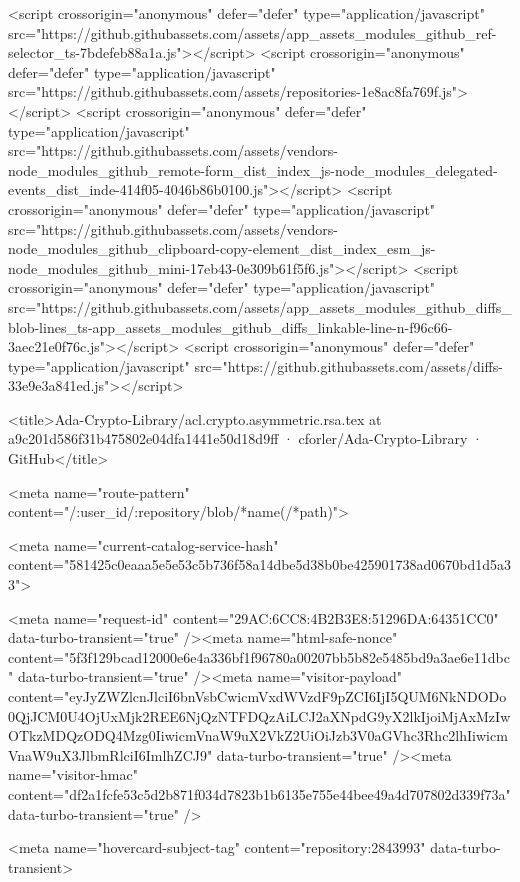<script crossorigin="anonymous" defer="defer" type="application/javascript" src="https://github.githubassets.com/assets/app_assets_modules_github_ref-selector_ts-7bdefeb88a1a.js"></script>
<script crossorigin="anonymous" defer="defer" type="application/javascript" src="https://github.githubassets.com/assets/repositories-1e8ac8fa769f.js"></script>
<script crossorigin="anonymous" defer="defer" type="application/javascript" src="https://github.githubassets.com/assets/vendors-node_modules_github_remote-form_dist_index_js-node_modules_delegated-events_dist_inde-414f05-4046b86b0100.js"></script>
<script crossorigin="anonymous" defer="defer" type="application/javascript" src="https://github.githubassets.com/assets/vendors-node_modules_github_clipboard-copy-element_dist_index_esm_js-node_modules_github_mini-17eb43-0e309b61f5f6.js"></script>
<script crossorigin="anonymous" defer="defer" type="application/javascript" src="https://github.githubassets.com/assets/app_assets_modules_github_diffs_blob-lines_ts-app_assets_modules_github_diffs_linkable-line-n-f96c66-3aec21e0f76c.js"></script>
<script crossorigin="anonymous" defer="defer" type="application/javascript" src="https://github.githubassets.com/assets/diffs-33e9e3a841ed.js"></script>
  

  <title>Ada-Crypto-Library/acl.crypto.asymmetric.rsa.tex at a9c201d586f31b475802e04dfa1441e50d18d9ff · cforler/Ada-Crypto-Library · GitHub</title>



  <meta name="route-pattern" content="/:user_id/:repository/blob/*name(/*path)">

    
  <meta name="current-catalog-service-hash" content="581425c0eaaa5e5e53c5b736f58a14dbe5d38b0be425901738ad0670bd1d5a33">


  <meta name="request-id" content="29AC:6CC8:4B2B3E8:51296DA:64351CC0" data-turbo-transient="true" /><meta name="html-safe-nonce" content="5f3f129bcad12000e6e4a336bf1f96780a00207bb5b82e5485bd9a3ae6e11dbc" data-turbo-transient="true" /><meta name="visitor-payload" content="eyJyZWZlcnJlciI6bnVsbCwicmVxdWVzdF9pZCI6IjI5QUM6NkNDODo0QjJCM0U4OjUxMjk2REE6NjQzNTFDQzAiLCJ2aXNpdG9yX2lkIjoiMjAxMzIwOTkzMDQzODQ4Mzg0IiwicmVnaW9uX2VkZ2UiOiJzb3V0aGVhc3Rhc2lhIiwicmVnaW9uX3JlbmRlciI6ImlhZCJ9" data-turbo-transient="true" /><meta name="visitor-hmac" content="df2a1fcfe53c5d2b871f034d7823b1b6135e755e44bee49a4d707802d339f73a" data-turbo-transient="true" />


    <meta name="hovercard-subject-tag" content="repository:2843993" data-turbo-transient>


